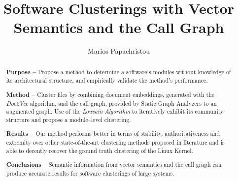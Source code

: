 \documentclass[sigconf,review, anonymous]{acmart}
\begin{document}
%
\title{Software Clusterings with Vector Semantics and 
the Call Graph}

%
\author{Marios Papachristou}


%
\renewcommand{\shortauthors}{Papachristou}

\begin{abstract}

\noindent \textbf{Purpose -- } Propose a method to determine a software's modules without 
knowledge of its architectural structure, and empirically validate the method's performance.

\noindent \textbf{Method -- } Cluster files by combining document embeddings, generated with the  \emph{Doc2Vec} algorithm, and the call graph, provided by Static Graph Analyzers to an augmented graph.
Use of the \emph{Louvain Algorithm} to iteratively exhibit its community structure and propose a module--level clustering. 


\noindent \textbf{Results --} Our method performs better in terms of stability, authoritativeness 
and extremity over other state-of-the-art clustering methods proposed in literature and is able to decently 
recover the ground truth clustering of the Linux Kernel. 

\noindent \textbf{Conclusions --} Semantic information from vector semantics and the call graph can produce 
accurate results for software clusterings of large systems.

\end{abstract}
\end{document}
